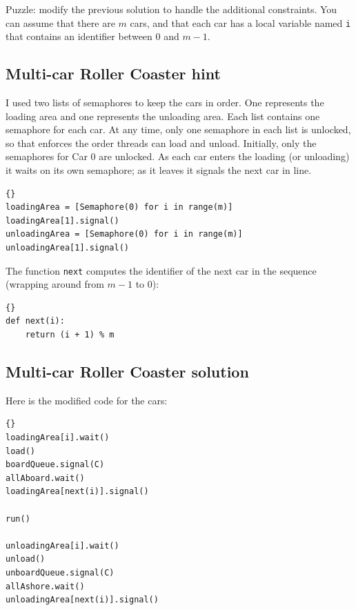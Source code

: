 \documentclass{book}
\newcommand{\clearemptydoublepage}{\newpage\cleardoublepage}
\begin{document}
Puzzle: modify
the previous solution to handle the additional constraints.
You can assume that there are $m$ cars, and that
each car has a local variable named {\tt i}
that contains an identifier between 0 and $m-1$.


\clearemptydoublepage
\subsection{Multi-car Roller Coaster hint}

I used two lists of semaphores to keep the cars in order.  One
represents the loading area and one represents the unloading area.
Each list contains one semaphore for each car.
At any time, only one semaphore in each
list is unlocked, so that enforces the order threads can
load and unload.
Initially, only the semaphores for Car 0 are unlocked.
As each car enters the
loading (or unloading) it waits on its own semaphore; as it leaves it
signals the next car in line.

\begin{lstlisting}[title={Multi-car Roller Coaster hint}]{}
loadingArea = [Semaphore(0) for i in range(m)]
loadingArea[1].signal()
unloadingArea = [Semaphore(0) for i in range(m)]
unloadingArea[1].signal()
\end{lstlisting}

The function {\tt next} computes the identifier of the next
car in the sequence (wrapping around from $m-1$ to 0):

\begin{lstlisting}[title={Implementation of {\tt next}}]{}
def next(i):
    return (i + 1) % m
\end{lstlisting}



\clearemptydoublepage
\subsection{Multi-car Roller Coaster solution}

Here is the modified code for the cars:

\begin{lstlisting}[title={Multi-car Roller Coaster solution (car)}]{}
loadingArea[i].wait()
load()
boardQueue.signal(C)
allAboard.wait()
loadingArea[next(i)].signal()

run()

unloadingArea[i].wait()
unload()
unboardQueue.signal(C)
allAshore.wait()
unloadingArea[next(i)].signal()
\end{lstlisting}
\end{document}
